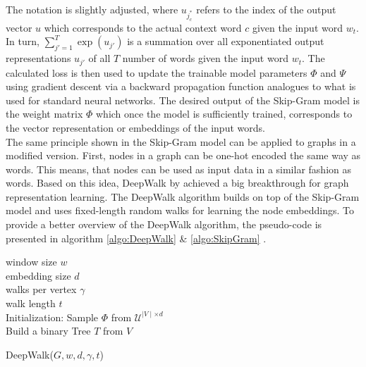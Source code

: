 	\noindent The notation is slightly adjusted, where $u_{j_{c}^{*}}$ refers
	to the index of the output vector $u$ which corresponds to the actual
	context word $c$ given the input word $w_{t}$. In turn, 
	$\sum_{j'=1}^{T}\exp(u_{j'})$ is a summation over all exponentiated output 
	representations $u_{j'}$ of all $T$ number of words given the input word 
	$w_{t}$. The calculated loss is then used to update the trainable model 
	parameters $\Phi$ and $\Psi$ using gradient descent via a backward 
	propagation function analogues to what is used for standard neural 
	networks. The desired output of the Skip-Gram model is the weight matrix
	$\Phi$ which once the model is sufficiently trained, corresponds to the
	vector representation or embeddings of the input words. \\

	\noindent The same principle shown in the Skip-Gram model can be applied
	to graphs in a modified version. First, nodes in a graph can be one-hot
	encoded the same way as words. This means, that nodes can be used as input
	data in a similar fashion as words. Based on this idea, DeepWalk by
	\cite{perozzi2014deepwalk} achieved a big breakthrough for graph
	representation learning. The DeepWalk algorithm builds on top of the 
	Skip-Gram model and uses fixed-length random walks for learning the node 
	embeddings. To provide a better overview of the DeepWalk algorithm, 
	the pseudo-code is presented in algorithm \ref{algo:DeepWalk} \& 
	\ref{algo:SkipGram} \citep[p. 704]{perozzi2014deepwalk}.
	
	\begin{algorithm}[h]
		\scriptsize
		\SetAlgoLined
		window size $w$\\
		embedding size $d$\\
		walks per vertex $\gamma$\\
		walk length $t$\\
		\nl Initialization: Sample $\Phi$ from $\mathcal{U}^{\mid V
		\mid \times d}$ \\
		\nl Build a binary Tree $T$ from $V$ \\
		\nl {}
		\caption[DeepWalk]{DeepWalk($G,w,d,\gamma,t$)}
		\label{algo:DeepWalk}
	\end{algorithm}
	
